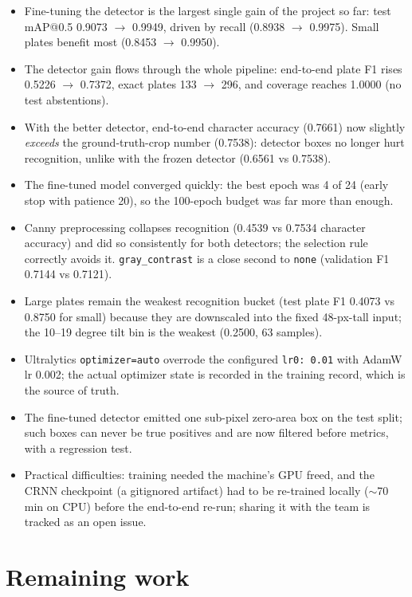 \documentclass[11pt]{article}
\begin{document}
\begin{itemize}
\item Fine-tuning the detector is the largest single gain of the project so
  far: test mAP@0.5 0.9073 $\rightarrow$ 0.9949, driven by recall
  (0.8938 $\rightarrow$ 0.9975). Small plates benefit most
  (0.8453 $\rightarrow$ 0.9950).
\item The detector gain flows through the whole pipeline: end-to-end plate F1
  rises 0.5226 $\rightarrow$ 0.7372, exact plates 133 $\rightarrow$ 296, and
  coverage reaches 1.0000 (no test abstentions).
\item With the better detector, end-to-end character accuracy (0.7661) now
  slightly \emph{exceeds} the ground-truth-crop number (0.7538): detector
  boxes no longer hurt recognition, unlike with the frozen detector
  (0.6561 vs 0.7538).
\item The fine-tuned model converged quickly: the best epoch was 4 of 24
  (early stop with patience 20), so the 100-epoch budget was far more than
  enough.
\item Canny preprocessing collapses recognition (0.4539 vs 0.7534 character
  accuracy) and did so consistently for both detectors; the selection rule
  correctly avoids it. \texttt{gray\_contrast} is a close second to
  \texttt{none} (validation F1 0.7144 vs 0.7121).
\item Large plates remain the weakest recognition bucket (test plate F1
  0.4073 vs 0.8750 for small) because they are downscaled into the fixed
  48-px-tall input; the 10--19 degree tilt bin is the weakest (0.2500,
  63 samples).
\item Ultralytics \texttt{optimizer=auto} overrode the configured
  \texttt{lr0: 0.01} with AdamW lr 0.002; the actual optimizer state is
  recorded in the training record, which is the source of truth.
\item The fine-tuned detector emitted one sub-pixel zero-area box on the
  test split; such boxes can never be true positives and are now filtered
  before metrics, with a regression test.
\item Practical difficulties: training needed the machine's GPU freed, and
  the CRNN checkpoint (a gitignored artifact) had to be re-trained locally
  ($\sim$70 min on CPU) before the end-to-end re-run; sharing it with the
  team is tracked as an open issue.
\end{itemize}

\section{Remaining work}
\end{document}
